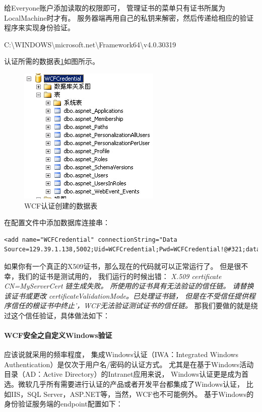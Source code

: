 \documentclass{book}
\begin{document}
给Everyone账户添加读取的权限即可，
管理证书的菜单只有证书所属为LocalMachine时才有。
服务器端再用自己的私钥来解密，然后传递给相应的验证程序来实现身份验证。 

C:\textbackslash WINDOWS\textbackslash microsoft.net\textbackslash Framework64\textbackslash v4.0.30319

认证所需的数据表\ref{fig:AspNetCredentialTable}如图所示。

\begin{figure}[htbp]
	\centering
	\includegraphics[scale=1]{AspNetCredentialTable.jpg}
	\caption{WCF认证创建的数据表}
	\label{fig:AspNetCredentialTable}
\end{figure}

在配置文件中添加数据库连接串：

\begin{lstlisting}
<add name="WCFCredential" connectionString="Data Source=129.39.1.138,5002;Uid=WCFCredential;Pwd=WCFCredential!@#321;database=WCFCredential"/>
\end{lstlisting}

如果你有一个真正的X509证书，那么现在的代码就可以正常运行了。
但是很不幸，我们的证书是测试用的，
我们运行的时候出错：\emph{ X.509 certificate CN=MyServerCert 链生成失败。
所使用的证书具有无法验证的信任链。
请替换该证书或更改 certificateValidationMode。已处理证书链，
但是在不受信任提供程序信任的根证书中终止'，WCF无法验证测试证书的信任链。}
那我们要做的就是绕过这个信任验证，具体做法如下：

\paragraph{WCF安全之自定义Windows验证}

应该说就采用的频率程度，
集成Windows认证（IWA：Integrated Windows Authentication）是仅次于用户名/密码的认证方式。
尤其是在基于Windows活动目录（AD：Active Directory）的Intranet应用来说，
Windows认证更是成为首选。微软几乎所有需要进行认证的产品或者开发平台都集成了Windows认证，
比如IIS，SQL Server，ASP.NET等，当然，WCF也不可能例外。
基于Windows的身份验证服务端的endpoint配置如下：
\end{document}
